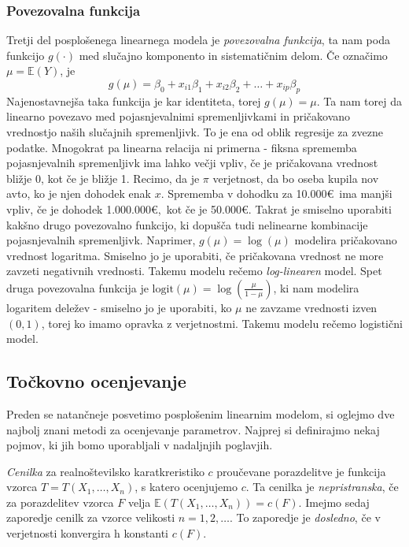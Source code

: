 \documentclass[12pt,a4paper]{amsart}
\theoremstyle{definition} %
\theoremstyle{plain} %
\begin{document}
\subsubsection{Povezovalna funkcija}
Tretji del posplošenega linearnega modela je \textit{povezovalna funkcija}, ta nam poda funkcijo $g(\cdot)$ med slučajno komponento
in sistematičnim delom. Če označimo $\mu = \mathbb{E}(Y)$, je
\[
    g(\mu) = \beta_{0} + x_{i1}\beta_{1} + x_{i2}\beta_{2} + \ldots + x_{ip}\beta_{p}
\]
Najenostavnejša taka funkcija je kar identiteta, torej $g(\mu) = \mu$. Ta nam torej da linearno povezavo med pojasnjevalnimi spremenljivkami 
in pričakovano vrednostjo naših slučajnih spremenljivk. To je ena od oblik regresije za zvezne podatke.
Mnogokrat pa linearna relacija ni primerna - fiksna sprememba pojasnjevalnih spremenljivk ima lahko večji vpliv, če je pričakovana vrednost 
bližje 0, kot če je bližje 1. Recimo, da je $\pi$ verjetnost, da bo oseba kupila nov avto, ko je njen dohodek enak $x$. Sprememba v dohodku
za 10.000\euro~ima manjši vpliv, če je dohodek 1.000.000\euro,~kot če je 50.000\euro.
Takrat je smiselno uporabiti kakšno drugo povezovalno funkcijo, ki dopušča tudi nelinearne kombinacije pojasnjevalnih
spremenljivk. Naprimer, $g(\mu) = \log(\mu)$ modelira
pričakovano vrednost logaritma. Smiselno jo je uporabiti, če pričakovana vrednost ne more zavzeti negativnih vrednosti. Takemu modelu rečemo
\textit{log-linearen} model.
Spet druga povezovalna funkcija je $\mathrm{logit}(\mu) = \log(\frac{\mu}{1-\mu})$, ki nam modelira logaritem deležev - smiselno jo je uporabiti, 
ko $\mu$ ne zavzame vrednosti izven $(0,1)$, torej ko imamo opravka z verjetnostmi. Takemu modelu rečemo logistični model.
\subsection{Točkovno ocenjevanje}
Preden se natančneje posvetimo posplošenim linearnim modelom, si oglejmo dve najbolj znani metodi za ocenjevanje parametrov.
Najprej si definirajmo nekaj pojmov, ki jih bomo uporabljali v nadaljnjih poglavjih.

\textit{Cenilka} za realnoštevilsko karatkreristiko $c$ proučevane porazdelitve je funkcija vzorca $T=T(X_{1},\ldots,X_{n})$, s katero ocenjujemo $c.$
Ta cenilka je \textit{nepristranska}, če za porazdelitev vzorca $F$ velja $\mathbb{E}(T(X_{1},\ldots,X_{n})) = c(F).$
Imejmo sedaj zaporedje cenilk za vzorce velikosti $n=1,2,\ldots.$ To zaporedje je \textit{dosledno}, če v verjetnosti konvergira h konstanti $c(F).$
\end{document}

